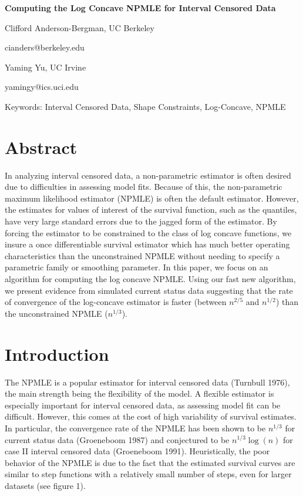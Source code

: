 \documentclass[10pt]{article}
\begin{document}
\begin{center}

{\bf Computing the Log Concave NPMLE for Interval Censored Data}

	\vspace{2mm}

	Clifford Anderson-Bergman, UC Berkeley
	
	cianders@berkeley.edu

	\vspace{2mm}
	
	Yaming Yu, UC Irvine
	
	yamingy@ics.uci.edu

	\vspace{2mm}
	
	Keywords: Interval Censored Data, Shape Constraints, Log-Concave, NPMLE
\end{center}

{\section {Abstract}}

	In analyzing interval censored data, a non-parametric estimator is often desired due to difficulties in assessing model fits. Because of this, the non-parametric maximum likelihood estimator (NPMLE) is often the default estimator. However, the estimates for values of interest of the survival function, such as the quantiles, have very large standard errors due to the jagged form of the estimator. By forcing the estimator to be constrained to the class of log concave functions, we insure a once differentiable survival estimator which has much better operating characteristics than the unconstrained NPMLE without needing to specify a parametric family or smoothing parameter. In this paper, we focus on an algorithm for computing the log concave NPMLE. Using our fast new algorithm, we present evidence from simulated current status data suggesting that the rate of convergence of the log-concave estimator is faster (between $n^{2/5}$ and $n^{1/2}$) than the unconstrained NPMLE ($n^{1/3}$).

{\section{Introduction}}

	The NPMLE is a popular estimator for interval censored data (Turnbull 1976), the main strength being the flexibility of the model. A flexible estimator is especially important for interval censored data, as assessing model fit can be difficult. However, this comes at the cost of high variability of survival estimates. In particular, the convergence rate of the NPMLE has been shown to be $n^{1/3}$ for current status data (Groeneboom 1987) and conjectured to be $ n^{1/3}\log(n)$ for case II interval censored data (Groeneboom 1991). Heuristically, the poor behavior of the NPMLE is due to the fact that the estimated survival curves are similar to step functions with a relatively small number of steps, even for larger datasets (see figure 1).
\end{document}
